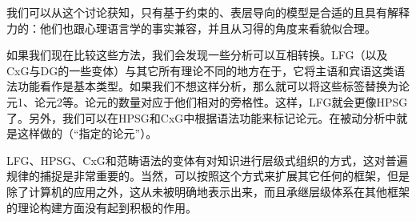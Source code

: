 我们可以从这个讨论获知，只有基于约束的、表层导向的模型是合适的且具有解释力的：他们也跟心理语言学的事实兼容，并且从习得的角度来看貌似合理。

如果我们现在比较这些方法，我们会发现一些分析可以互相转换。LFG（以及CxG与DG的一些变体）与其它所有理论不同的地方在于，它将主语和宾语这类语法功能看作是基本类型。如果我们不想这样分析，那么就可以将这些标签替换为论元1、论元2等。论元的数量对应于他们相对的旁格性。这样，LFG就会更像HPSG了。另外，我们可以在HPSG和CxG中根据语法功能来标记论元。在被动分析中就是这样做的（“指定的论元”）。

LFG、HPSG、CxG和范畴语法的变体\citep{MCKRZ89a-u,Briscoe2000a,Villavicencio2002a}有对知识进行层级式组织的方式，这对普遍规律的捕捉是非常重要的。当然，可以按照这个方式来扩展其它任何的框架，但是除了计算机的应用之外，这从未被明确地表示出来，而且承继层级体系在其他框架的理论构建方面没有起到积极的作用。

